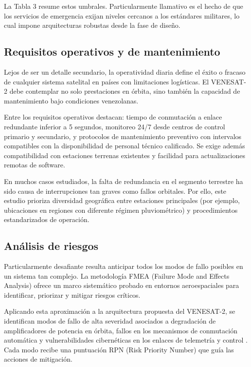 La Tabla 3 resume estos umbrales. Particularmente llamativo es el hecho de que los servicios de emergencia exijan niveles cercanos a los estándares militares, lo cual impone arquitecturas robustas desde la fase de diseño.

\subsection{Requisitos operativos y de mantenimiento}

Lejos de ser un detalle secundario, la operatividad diaria define el éxito o fracaso de cualquier sistema satelital en países con limitaciones logísticas. El VENESAT-2 debe contemplar no solo prestaciones en órbita, sino también la capacidad de mantenimiento bajo condiciones venezolanas.

Entre los requisitos operativos destacan: tiempo de conmutación a enlace redundante inferior a 5 segundos, monitoreo 24/7 desde centros de control primario y secundario, y protocolos de mantenimiento preventivo con intervalos compatibles con la disponibilidad de personal técnico calificado. Se exige además compatibilidad con estaciones terrenas existentes y facilidad para actualizaciones remotas de software.

En muchos casos estudiados, la falta de redundancia en el segmento terrestre ha sido causa de interrupciones tan graves como fallos orbitales. Por ello, este estudio prioriza diversidad geográfica entre estaciones principales (por ejemplo, ubicaciones en regiones con diferente régimen pluviométrico) y procedimientos estandarizados de operación.

\subsection{Análisis de riesgos}

Particularmente desafiante resulta anticipar todos los modos de fallo posibles en un sistema tan complejo. La metodología FMEA (Failure Mode and Effects Analysis) ofrece un marco sistemático probado en entornos aeroespaciales para identificar, priorizar y mitigar riesgos críticos.

Aplicando esta aproximación a la arquitectura propuesta del VENESAT-2, se identifican modos de fallo de alta severidad asociados a degradación de amplificadores de potencia en órbita, fallos en los mecanismos de conmutación automática y vulnerabilidades cibernéticas en los enlaces de telemetría y control \cite{FMEASatellite2013}. Cada modo recibe una puntuación RPN (Risk Priority Number) que guía las acciones de mitigación.

